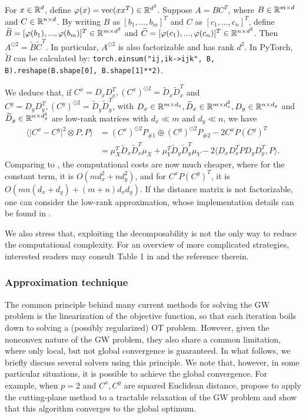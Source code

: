 \begin{lemma}
  For $x \in \mathbb R^d$, define $\varphi(x) = \text{vec}(xx^T) \in \mathbb R^{d^2}$.
  Suppose $A = B C^T$, where $B \in \mathbb R^{m \times d}$ and $C \in \mathbb R^{n \times d}$.
  By writing $B$ as $[b_1, ..., b_m]^T$ and $C$ as $[c_1, ..., c_n]^T$, define
  $\widetilde{B} = [\varphi(b_1), ..., \varphi(b_m)]^T \in \mathbb R^{m \times d^2}$ and
  $\widetilde{C} = [\varphi(c_1), ..., \varphi(c_n)]^T \in \mathbb R^{n \times d^2}$.
  Then $A^{\odot 2} = \widetilde{B} \widetilde{C}^T$. In particular, $A^{\odot 2}$ is also
  factorizable and has rank $d^2$. In PyTorch, $\widetilde{B}$ can be calculated by:
  \texttt{torch.einsum("ij,ik->ijk", B, B).reshape(B.shape[0], B.shape[1]**2)}.
\end{lemma}
We deduce that, if $C^x = D_x D_x^T, (C^x)^{\odot 2} = \widetilde{D}_x \widetilde{D}_x^T$
and $C^y = D_y D_y^T, (C^y)^{\odot 2} = \widetilde{D}_y \widetilde{D}_y^T$,
with $D_x \in \mathbb R^{m \times d_x}, \widetilde{D}_x \in \mathbb R^{m \times d_x^2},
D_y \in \mathbb R^{n \times d_y}$ and $\widetilde{D}_y \in \mathbb R^{n \times d_y^2}$ are low-rank matrices
with $d_x \ll m$ and $d_y \ll n$, we have
\begin{align}
  \langle \vert C^x - C^y \vert^2 \otimes P, P \rangle
  &= (C^x)^{\odot 2} P_{\# 1} \oplus (C^y)^{\odot 2} P_{\# 2} - 2 C^x P (C^y)^T \\
  &= \mu_X^T \widetilde{D}_x \widetilde{D}_x^T \mu_X
  + \mu_Y^T \widetilde{D}_y \widetilde{D}_y^T \mu_Y - 2 \langle D_x D_x^T P D_y D_y^T, P \rangle.
\end{align}
Comparing to , the computational costs are now much cheaper,
where for the constant term, it is $O(m d_x^2 + n d_y^2)$, and for $C^x P (C^y)^T$,
it is $O(mn(d_x + d_y) + (m+n) d_x d_y)$. If the distance matrix is not factorizable,
one can consider the low-rank approximation,
whose implementation details can be found in \citep{Meyer21a}.

We also stress that, exploiting the decomposability is not the only way to reduce the computational
complexity. For an overview of more complicated strategies,
interested readers may consult Table 1 in \citep{Li23} and the reference therein.

\subsubsection{Approximation technique}
The common principle behind many current methods for solving the GW problem
is the linearization of the objective function,
so that each iteration boils down to solving a (possibly regularized)
OT problem. However, given the nonconvex nature of the GW problem, they also share
a common limitation, where only local, but not global convergence is guaranteed.
In what follows, we briefly discuss several solvers using this principle.
We note that, however, in some particular situations, it is possible to achieve the
global convergence. For example, when $p=2$ and $C^x, C^y$ are squared Euclidean distance,
\citep{Ryner23} propose to apply the cutting-plane method to a tractable relaxation of the GW problem
and show that this algorithm converges to the global optimum.


